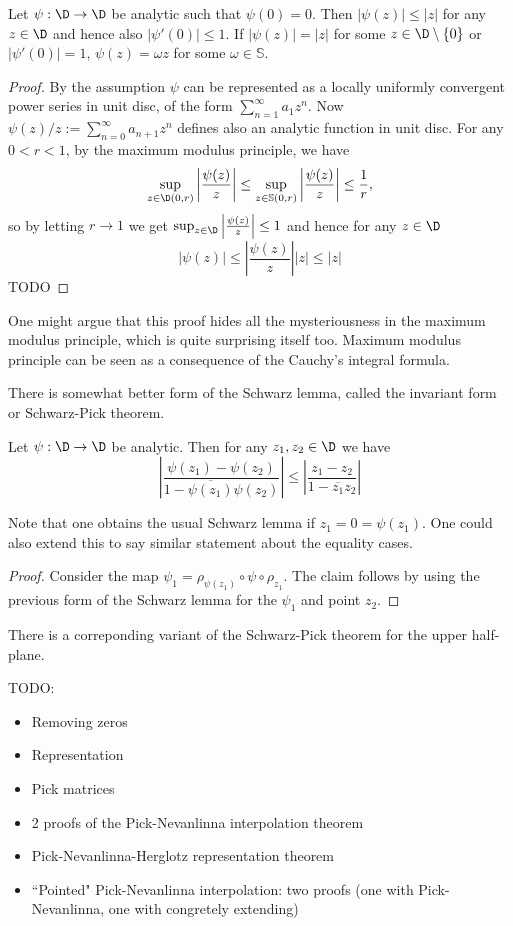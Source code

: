\begin{lause}
	Let $\psi : \D \to \D$ be analytic such that $\psi(0) = 0$. Then $|\psi(z)| \leq |z|$ for any $z \in \D$ and hence also $|\psi'(0)| \leq 1$. If $|\psi(z)| = |z|$ for some $z \in \D \setminus \{0\}$ or $|\psi'(0)| = 1$, $\psi(z) = \omega z$ for some $\omega \in \mathbb{S}$.
\end{lause}
\begin{proof}
	By the assumption $\psi$ can be represented as a locally uniformly convergent power series in unit disc, of the form $\sum_{n = 1}^{\infty}a_{1} z^{n}$. Now $\psi(z)/z := \sum_{n = 0}^{\infty} a_{n + 1} z^{n}$ defines also an analytic function in unit disc. For any $0 < r < 1$, by the maximum modulus principle, we have
	\[
		\sup_{z \in \D(0, r)} \left|\frac{\psi(z)}{z}\right| \leq \sup_{z \in \mathbb{S}(0, r)} \left|\frac{\psi(z)}{z}\right| \leq \frac{1}{r},
	\]
	so by letting $r \to 1$ we get $\sup_{z \in \D} \left|\frac{\psi(z)}{z}\right| \leq 1$ and hence for any $z \in \D$
	\[
		|\psi(z)| \leq \left|\frac{\psi(z)}{z}\right| |z| \leq |z|
	\]
	TODO
\end{proof}

One might argue that this proof hides all the mysteriousness in the maximum modulus principle, which is quite surprising itself too. Maximum modulus principle can be seen as a consequence of the Cauchy's integral formula.

There is somewhat better form of the Schwarz lemma, called the invariant form or Schwarz-Pick theorem.

\begin{lause}
	Let $\psi : \D \to \D$ be analytic. Then for any $z_{1}, z_{2} \in \D$ we have
	\[
		\left|\frac{\psi(z_{1}) - \psi(z_{2})}{1 - \overline{\psi(z_{1})} \psi(z_{2})} \right| \leq \left|\frac{z_{1} - z_{2}}{1 - \overline{z_{1}}z_{2}}\right|
	\]
\end{lause}

Note that one obtains the usual Schwarz lemma if $z_{1} = 0 = \psi(z_{1})$. One could also extend this to say similar statement about the equality cases.
\begin{proof}
	Consider the map $\psi_{1} = \rho_{\psi(z_{1})} \circ \psi \circ \rho_{z_{1}}$. The claim follows by using the previous form of the Schwarz lemma for the $\psi_{1}$ and point $z_{2}$.
\end{proof}

There is a correponding variant of the Schwarz-Pick theorem for the upper half-plane.

TODO:
\begin{itemize}
	\item Removing zeros
	\item Representation
	\item Pick matrices
	\item 2 proofs of the Pick-Nevanlinna interpolation theorem
	\item Pick-Nevanlinna-Herglotz representation theorem
	\item ``Pointed" Pick-Nevanlinna interpolation: two proofs (one with Pick-Nevanlinna, one with congretely extending)
\end{itemize}

